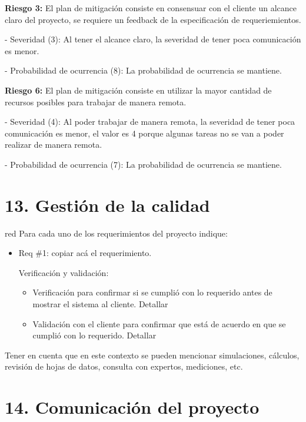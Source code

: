 \documentclass[11pt]{charter}
\begin{document}
 
\textbf{Riesgo 3: } El plan de mitigación consiste en consensuar con el cliente un alcance claro del proyecto, se requiere un feedback de la especificación de requeriemientos.
  
  - Severidad (3): Al tener el alcance claro, la severidad de tener poca comunicación es menor.
  
  - Probabilidad de ocurrencia (8): La probabilidad de ocurrencia se mantiene.

\textbf{Riesgo 6: } El plan de mitigación consiste en utilizar la mayor cantidad de recursos posibles para trabajar de manera remota.
  
  - Severidad (4): Al poder trabajar de manera remota, la severidad de tener poca comunicación es menor, el valor es 4 porque algunas tareas no se van a poder realizar de manera remota.
  
  - Probabilidad de ocurrencia (7): La probabilidad de ocurrencia se mantiene.

\section{13. Gestión de la calidad}
\label{sec:calidad}

\begin{consigna}{red}
Para cada uno de los requerimientos del proyecto indique:
\begin{itemize} 
\item Req \#1: copiar acá el requerimiento.

Verificación y validación:

\begin{itemize}
\item Verificación para confirmar si se cumplió con lo requerido antes de mostrar el sistema al cliente. Detallar 
\item Validación con el cliente para confirmar que está de acuerdo en que se cumplió con lo requerido. Detallar  
\end{itemize}

\end{itemize}

Tener en cuenta que en este contexto se pueden mencionar simulaciones, cálculos, revisión de hojas de datos, consulta con expertos, mediciones, etc.

\end{consigna}

\section{14. Comunicación del proyecto}
\label{sec:comunicaciones}
\end{document}

